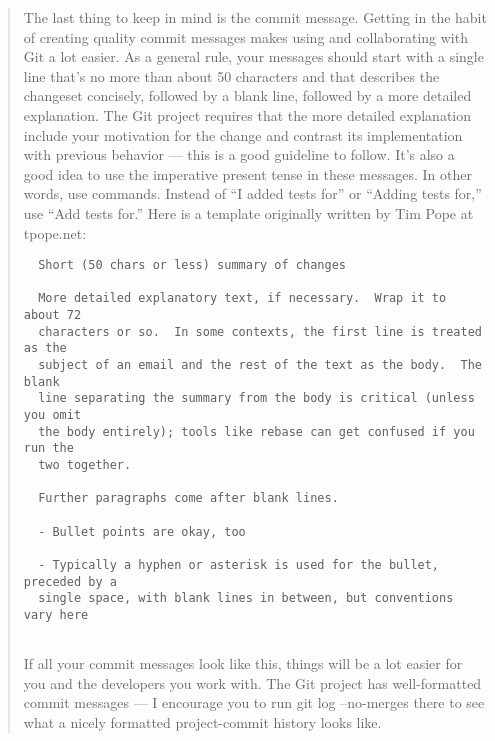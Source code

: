 \begin{quote}
  The last thing to keep in mind is the commit message. Getting in the habit of creating quality commit messages makes using and collaborating with Git a lot easier. As a general rule, your messages should start with a single line that’s no more than about 50 characters and that describes the changeset concisely, followed by a blank line, followed by a more detailed explanation. The Git project requires that the more detailed explanation include your motivation for the change and contrast its implementation with previous behavior — this is a good guideline to follow. It’s also a good idea to use the imperative present tense in these messages. In other words, use commands. Instead of “I added tests for” or “Adding tests for,” use “Add tests for.” Here is a template originally written by Tim Pope at tpope.net:

  \begin{verbatim}
  Short (50 chars or less) summary of changes

  More detailed explanatory text, if necessary.  Wrap it to about 72
  characters or so.  In some contexts, the first line is treated as the
  subject of an email and the rest of the text as the body.  The blank
  line separating the summary from the body is critical (unless you omit
  the body entirely); tools like rebase can get confused if you run the
  two together.

  Further paragraphs come after blank lines.

  - Bullet points are okay, too

  - Typically a hyphen or asterisk is used for the bullet, preceded by a
  single space, with blank lines in between, but conventions vary here


  \end{verbatim}
  If all your commit messages look like this, things will be a lot easier for you and the developers you work with. The Git project has well-formatted commit messages — I encourage you to run git log --no-merges there to see what a nicely formatted project-commit history looks like.
\end{quote}
